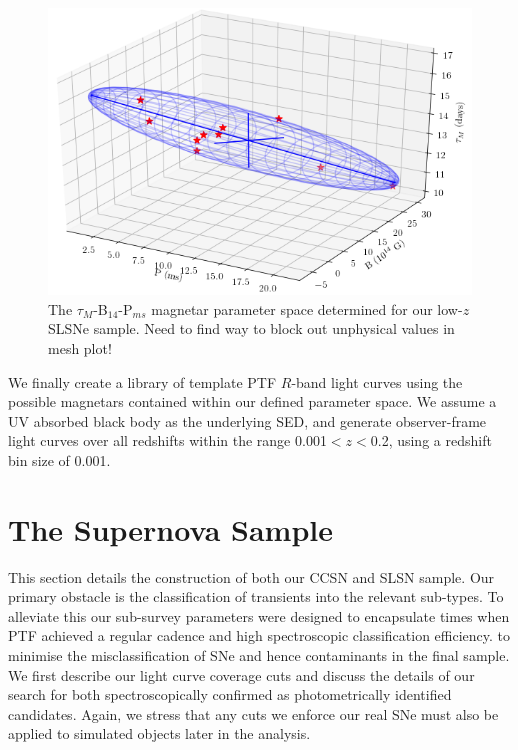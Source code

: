 \documentclass[a4paper,fleqn,usenatbib]{mnras}
\newcommand{\angus}[1]{\color{JungleGreen}#1\color{black}}
\begin{document}
\begin{figure}
	\includegraphics[width=\columnwidth]{./Original_3D_param_space.png}
    \caption{The $\tau_{M}$-B$_{14}$-P$_{ms}$ magnetar parameter space determined for our low-$z$ SLSNe sample. \angus{Need to find way to block out unphysical values in mesh plot!}}
    \label{fig:param_space}
\end{figure}

We finally create a library of template PTF $R$-band light curves using the possible magnetars contained within our defined parameter space. We assume a UV absorbed black body as the underlying SED, and generate observer-frame light curves over all redshifts within the range 0.001$< z <$0.2, using a redshift bin size of 0.001.

\section{The Supernova Sample}

This section details the construction of both our CCSN and SLSN sample. Our primary obstacle is the classification of transients into the relevant sub-types. To alleviate this our sub-survey parameters were designed to encapsulate times when PTF achieved a regular cadence and high spectroscopic classification efficiency.  to minimise the misclassification of SNe and hence contaminants in the final sample. We first describe our light curve coverage cuts and discuss the details of our search for both spectroscopically confirmed as photometrically identified candidates. Again, we stress that any cuts we enforce our real SNe must also be applied to simulated objects later in the analysis.
\end{document}
